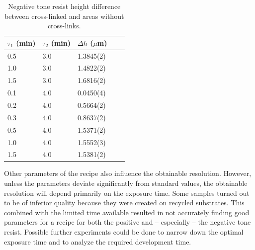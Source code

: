 \begin{table}[H]
    \centering
    \caption{Negative tone resist height difference between cross-linked and areas without cross-links.}
    \begin{tabular}{X l l l l}
	$\tau_1$ (min) & $\tau_2$ (min) & $\Delta h$ ($\mu$m) \\
        \hline\hline
        0.5 & 3.0 & 1.3845(2)  \\
        1.0 & 3.0 & 1.4822(2)  \\
        1.5 & 3.0 & 1.6816(2)  \\
        0.1 & 4.0 & 0.0450(4)  \\
        0.2 & 4.0 & 0.5664(2)  \\
        0.3 & 4.0 & 0.8637(2)  \\
        0.5 & 4.0 & 1.5371(2)  \\
        1.0 & 4.0 & 1.5552(3)  \\
        1.5 & 4.0 & 1.5381(2)  \\
        \hline
    \end{tabular}
    \label{tab:neg_profile}
\end{table} Other parameters of the recipe also influence the obtainable resolution. However, unless the parameters deviate significantly from standard values, the obtainable resolution will depend primarily on the exposure time. Some samples turned out to be of inferior quality because they were created on recycled substrates. This combined with the limited time available resulted in not accurately finding good parameters for a recipe for both the positive and -- especially -- the negative tone resist. Possible further experiments could be done to narrow down the optimal exposure time and to analyze the required development time.